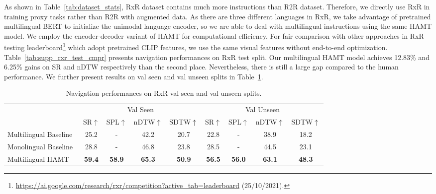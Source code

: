 As shown in Table~\ref{tab:dataset_stats}, RxR dataset contains much more instructions than R2R dataset. Therefore, we directly use RxR in training proxy tasks rather than R2R with augmented data.
As there are three different languages in RxR, we take advantage of pretrained multilingual BERT \cite{conneau2020unsupervised} to initialize the unimodal language encoder, so we are able to deal with multilingual instructions using the same HAMT model.
We employ the encoder-decoder variant of HAMT for computational efficiency.
For fair comparison with other approaches in RxR testing leaderboard\footnote{\url{https://ai.google.com/research/rxr/competition?active_tab=leaderboard} (25/10/2021).} which adopt pretrained CLIP \cite{radford2021learning} features, we use the same visual features without end-to-end optimization.
Table~\ref{tab:supp_rxr_test_cmpr} presents navigation performances on RxR test split. Our multilingual HAMT model achieves 12.83\% and 6.25\% gains on SR and nDTW respectively than the second place. Nevertheless, there is still a large gap compared to the human performance.
We further present results on val seen and val unseen splits in Table~\ref{tab:supp_rxr_val_cmpr}.

\begin{table}
\centering
\small
\caption{Navigation performances on RxR val seen and val unseen splits.}
\label{tab:supp_rxr_val_cmpr}
\begin{tabular}{lcccccccc} \toprule
 & \multicolumn{4}{c}{Val Seen} & \multicolumn{4}{c}{Val Unseen} \\
 & SR$\uparrow$ & SPL$\uparrow$ & nDTW$\uparrow$ & SDTW$\uparrow$ & SR$\uparrow$ & SPL$\uparrow$ & nDTW$\uparrow$ & SDTW$\uparrow$ \\ \midrule
Multilingual Baseline~\cite{ku2020room} & 25.2 & - & 42.2 & 20.7 & 22.8 & - & 38.9 & 18.2 \\
Monolingual Baseline~\cite{ku2020room} & 28.8 & - & 46.8 & 23.8 & 28.5 & - & 44.5 & 23.1 \\ \midrule
Multilingual HAMT & \textbf{59.4} & \textbf{58.9} & \textbf{65.3} & \textbf{50.9}  & \textbf{56.5} & \textbf{56.0} & \textbf{63.1} & \textbf{48.3} \\ \bottomrule
\end{tabular}
\end{table}


